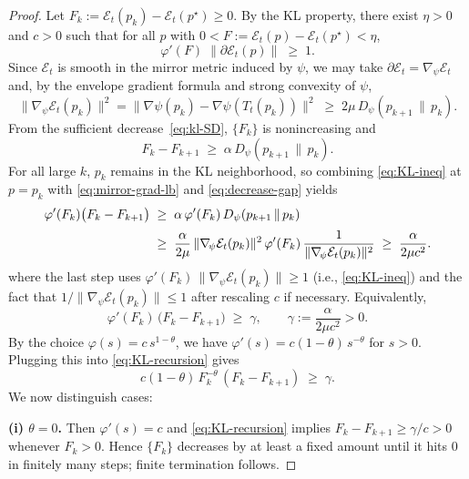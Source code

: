 \documentclass[11pt]{article}
\newcommand{\Ecal}{\mathcal{E}}
\theoremstyle{plain}
\theoremstyle{definition}
\theoremstyle{remark}
\begin{document}
\begin{proof}
Let $F_k:=\Ecal_t(p_k)-\Ecal_t(p^\star)\ge 0$.
By the KL property, there exist $\eta>0$ and $c>0$ such that for all $p$ with $0<F:=\Ecal_t(p)-\Ecal_t(p^\star)<\eta$,
\begin{equation}
\varphi'(F)\;\|\partial \Ecal_t(p)\|\;\ge\;1.
\label{eq:KL-ineq}
\end{equation}
Since $\Ecal_t$ is smooth in the mirror metric induced by $\psi$, we may take $\partial \Ecal_t=\nabla_{\!\psi}\Ecal_t$ and,
by the envelope gradient formula and strong convexity of $\psi$,
\begin{equation}
\|\nabla_{\!\psi}\Ecal_t(p_k)\|^2
=\|\nabla\psi(p_k)-\nabla\psi(T_t(p_k))\|^2
\;\ge\;2\mu\,D_\psi(p_{k+1}\,\|\,p_k).
\label{eq:mirror-grad-lb}
\end{equation}
From the sufficient decrease~\eqref{eq:kl-SD}, $\{F_k\}$ is nonincreasing and
\begin{equation}
F_k-F_{k+1}
\;\ge\;\alpha\,D_\psi(p_{k+1}\,\|\,p_k).
\label{eq:decrease-gap}
\end{equation}
For all large $k$, $p_k$ remains in the KL neighborhood, so combining \eqref{eq:KL-ineq} at $p=p_k$
with \eqref{eq:mirror-grad-lb} and \eqref{eq:decrease-gap} yields
\begin{align}
\varphi'(F_k)\big(F_k-F_{k+1}\big)
&\;\ge\;\alpha\,\varphi'(F_k)\,D_\psi(p_{k+1}\,\|\,p_k) \notag\\[2pt]
&\;\ge\;\frac{\alpha}{2\mu}\,
   \|\nabla_{\!\psi}\Ecal_t(p_k)\|^2\,\varphi'(F_k)\,
   \frac{1}{\|\nabla_{\!\psi}\Ecal_t(p_k)\|^2}
   \;\ge\;\frac{\alpha}{2\mu c^2}.
\label{eq:kl-two-step}
\end{align}
where the last step uses $\varphi'(F_k)\,\|\nabla_{\!\psi}\Ecal_t(p_k)\|\ge 1$ (i.e., \eqref{eq:KL-ineq}) and the fact that $1/\|\nabla_{\!\psi}\Ecal_t(p_k)\|\le 1$ after rescaling $c$ if necessary.
Equivalently,
\begin{equation}
\varphi'(F_k)\,\big(F_k-F_{k+1}\big)\;\ge\;\gamma,
\qquad
\gamma:=\frac{\alpha}{2\mu c^2}>0.
\label{eq:KL-recursion}
\end{equation}
By the choice $\varphi(s)=c\,s^{1-\theta}$, we have
$\varphi'(s)=c(1-\theta)\,s^{-\theta}$ for $s>0$.
Plugging this into \eqref{eq:KL-recursion} gives
\[
c(1-\theta)\,F_k^{-\theta}\,(F_k-F_{k+1})\;\ge\;\gamma.
\]
We now distinguish cases:

\smallskip
\noindent\textbf{(i) $\theta=0$.}
Then $\varphi'(s)=c$ and \eqref{eq:KL-recursion} implies $F_k-F_{k+1}\ge \gamma/c>0$ whenever $F_k>0$.
Hence $\{F_k\}$ decreases by at least a fixed amount until it hits $0$ in finitely many steps; finite termination follows.


\end{proof}
\end{document}
